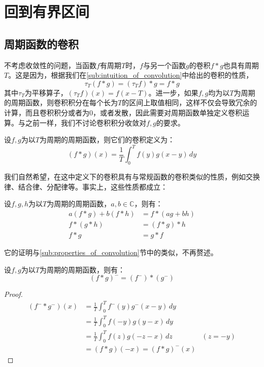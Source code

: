 \section{回到有界区间}\label{sec:Finite_Interval}

\subsection{周期函数的卷积}\label{sub:conv_of_period_func}

不考虑收敛性的问题，当函数$f$有周期$T$时，$f$与另一个函数$g$的卷积$f*g$也具有周期$T$。这是因为，根据我们在\ref{sub:intuition_of_convolution}中给出的卷积的性质，
\[\tau_T(f*g)=(\tau_T f)*g=f*g\]
其中$\tau_T$为平移算子，$(\tau_T f)(x)=f(x-T)$。进一步，如果$f,g$均为以$T$为周期的周期函数，则卷积积分在每个长为$T$的区间上取值相同，这样不仅会导致冗余的计算，而且卷积积分或者为0，或者发散，因此需要对周期函数单独定义卷积运算。与之前一样，我们不讨论卷积积分收敛对$f,g$的要求。

\begin{definition}[周期函数的卷积]
    设$f,g$为以$T$为周期的周期函数，则它们的卷积定义为：
    \[(f*g)(x)=\frac{1}{T}\int_{0}^{T}f(y)g(x-y)\,dy\]
\end{definition}

我们自然希望，在这中定义下的卷积具有与常规函数的卷积类似的性质，例如交换律、结合律、分配律等。事实上，这些性质都成立：
\begin{proposition}
    设$f,g,h$为以$T$为周期的周期函数，$a,b\in\mathbb{C}$，则有：
    \begin{align*}
        a(f*g)+b(f*h)&=f*(ag+bh)\\
        f*(g*h)&=(f*g)*h\\
        f*g&=g*f
    \end{align*}    
\end{proposition}
它的证明与\ref{sub:properties_of_convolution}节中的类似，不再赘述。

\begin{proposition}[信号反转]
    设$f,g$为以$T$为周期的周期函数，则有：
    \[(f*g)^-=(f^-)*(g^-)\]
\end{proposition}
\begin{proof}
    \begin{align*}
        (f^-*g^-)(x)&=\frac{1}{T}\int_0^{T}f^-(y)g^-(x-y)\,dy\\
        &=\frac{1}{T}\int_0^{T}f(-y)g(y-x)\,dy\\
        &=\frac{1}{T}\int_0^{T}f(z)g(-z-x)\,dz&(z=-y)\\
        &=(f*g)(-x)=(f*g)^-(x)
    \end{align*}
\end{proof}

